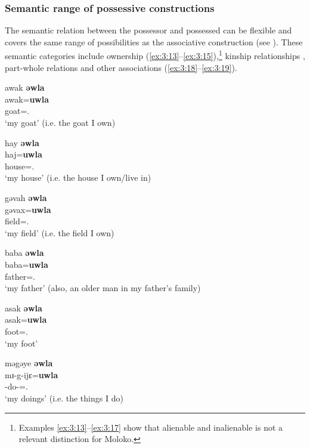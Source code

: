 \subsubsection{Semantic range of possessive constructions}\label{sec:3.1.2.1}

The semantic relation between the possessor and possessed can be flexible and covers the same range of possibilities as the associative construction (see ). These semantic categories include ownership (\ref{ex:3:13}--\ref{ex:3:15}),\footnote{Examples \ref{ex:3:13}--\ref{ex:3:17} show that alienable and inalienable is not a relevant distinction for Moloko.} kinship relationships , part-whole relations  and other associations (\ref{ex:3:18}--\ref{ex:3:19}).  

\ea \label{ex:3:13}
awak  \textbf{əwla}\\
\gll  awak=\textbf{uwla}\\
      goat={\oneS}.{\POSS}\\
\glt  ‘my goat’ (i.e. the goat I own)
\z

\ea \label{ex:3:14}
hay   \textbf{əwla}\\
\gll  haj=\textbf{uwla}\\
      house={\oneS}.{\POSS}\\
\glt  ‘my house’ (i.e. the house I own/live in)
\z

\ea \label{ex:3:15}
gəvah  \textbf{əwla}\\
\gll  gəvax=\textbf{uwla}\\
      field={\oneS}.{\POSS}\\
\glt  ‘my field’ (i.e. the field I own)
\z

\ea \label{ex:3:16}
baba  \textbf{əwla}\\
\gll  baba=\textbf{uwla}\\
      father={\oneS}.{\POSS}\\
\glt  ‘my father’ (also, an older man in my father’s family)
\z

\ea \label{ex:3:17}
asak  \textbf{əwla}\\
\gll  asak=\textbf{uwla}\\
      foot={\oneS}.{\POSS}\\
\glt  ‘my foot’ 
\z

\clearpage
\ea \label{ex:3:18}
məgəye  \textbf{əwla}\\
\gll  mɪ-g-ijɛ=\textbf{uwla}\\
      {\NOM}{}-do-{\CL}={\oneS}.{\POSS}\\
\glt  ‘my doings’ (i.e. the things I do)
\z

